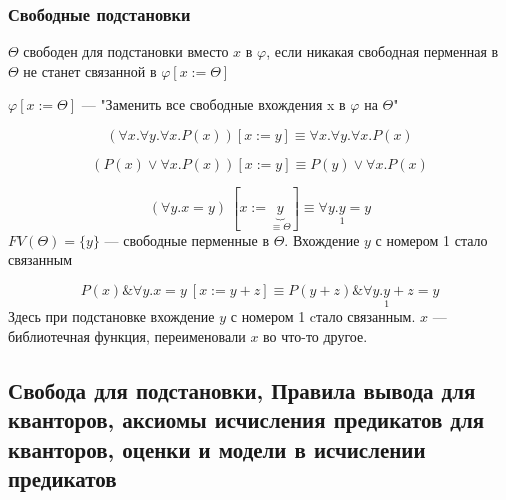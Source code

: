 \documentclass[english]{article}
\begin{document}
\subsubsection{Свободные подстановки}
\label{sec:org1cdf525}
\begin{definition}
	\(\Theta\) свободен для подстановки вместо \(x\) в \(\varphi\), если никакая свободная перменная в \(\Theta\) не станет связанной в \(\varphi[x := \Theta]\)
\end{definition}
\begin{definition}
	\(\varphi[x := \Theta]\) --- "Заменить все свободные вхождения x в \(\varphi\) на \(\Theta\)"
\end{definition}
\begin{examp}
	\[ (\forall x. \forall y. \forall x. P(x))[x := y] \equiv \forall x. \forall y. \forall x. P(x) \]
\end{examp}
\begin{examp}
	\[ (P(x) \vee \forall x. P(x))[x := y] \equiv P(y) \vee \forall x. P(x) \]
\end{examp}
\begin{examp}
	\[ (\forall y. x = y)\ [x := \underbrace{y}_{\equiv \Theta}] \equiv \forall y. \underset{1}{y} = y\]
	\(FV(\Theta) = \{y\}\) --- свободные перменные в \(\Theta\). Вхождение \(y\) с номером 1 стало связанным
\end{examp}
\begin{examp}
	\[ P(x) \& \forall y. x = y\ [x := y + z] \equiv P(y + z) \& \forall y. \underset{1}{y} + z = y \]
	Здесь при подстановке вхождение \(y\) с номером 1 cтало связанным. \(x\) --- библиотечная функция, переименовали \(x\) во что-то другое.
\end{examp}
\subsection{Свобода для подстановки, Правила вывода для кванторов, аксиомы исчисления предикатов для кванторов, оценки и модели в исчислении предикатов}
\label{sec:orgd0b59a7}
\end{document}
